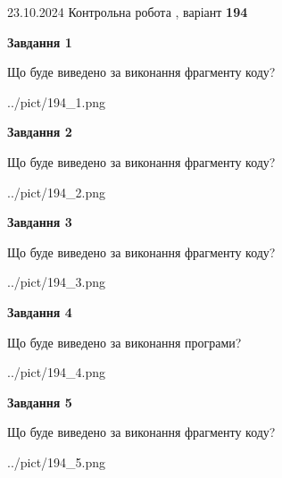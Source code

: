 \documentclass[12pt, ukrainian]{article}
\begin{document}
{\Large{23.10.2024 Контрольна робота , варіант  \No \textbf { 194 }\par}}
{
\begin {large}
{\begin {center}\textbf{Завдання 1}\end {center}}

Що буде виведено за виконання фрагменту коду?\par
\begin{center}
	{../pict/194_1.png}
\end{center}
\newpage

{\begin {center}\textbf{Завдання 2}\end {center}}

Що буде виведено за виконання фрагменту коду?\par
\begin{center}
	{../pict/194_2.png}
\end{center}
\newpage

{\begin {center}\textbf{Завдання 3}\end {center}}

Що буде виведено за виконання фрагменту коду?\par
\begin{center}
	{../pict/194_3.png}
\end{center}
\newpage

{\begin {center}\textbf{Завдання 4}\end {center}}

Що буде виведено за виконання програми?\par
\begin{center}
	{../pict/194_4.png}
\end{center}
\newpage

{\begin {center}\textbf{Завдання 5}\end {center}}

Що буде виведено за виконання фрагменту коду?\par
\begin{center}
	{../pict/194_5.png}
\end{center}
\newpage


\end{large}}
\end{document}
